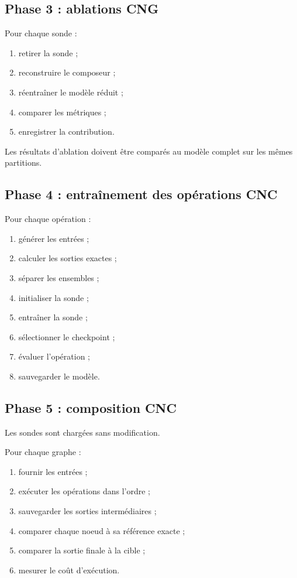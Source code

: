 \documentclass[11pt,a4paper]{article}
\begin{document}
\subsection{Phase 3 : ablations CNG}

Pour chaque sonde :
\begin{enumerate}
    \item retirer la sonde ;
    \item reconstruire le composeur ;
    \item réentraîner le modèle réduit ;
    \item comparer les métriques ;
    \item enregistrer la contribution.
\end{enumerate}

Les résultats d'ablation doivent être comparés
au modèle complet sur les mêmes partitions.

\subsection{Phase 4 : entraînement des opérations CNC}

Pour chaque opération :

\begin{enumerate}
    \item générer les entrées ;
    \item calculer les sorties exactes ;
    \item séparer les ensembles ;
    \item initialiser la sonde ;
    \item entraîner la sonde ;
    \item sélectionner le checkpoint ;
    \item évaluer l'opération ;
    \item sauvegarder le modèle.
\end{enumerate}

\subsection{Phase 5 : composition CNC}

Les sondes sont chargées sans modification.

Pour chaque graphe :
\begin{enumerate}
    \item fournir les entrées ;
    \item exécuter les opérations dans l'ordre ;
    \item sauvegarder les sorties intermédiaires ;
    \item comparer chaque noeud à sa référence exacte ;
    \item comparer la sortie finale à la cible ;
    \item mesurer le coût d'exécution.
\end{enumerate}
\end{document}
